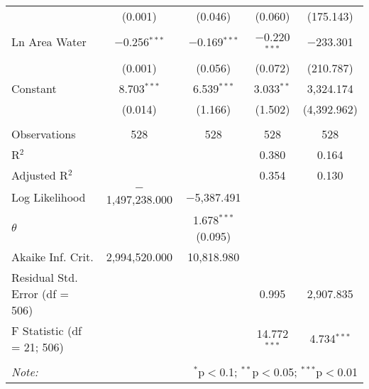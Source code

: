 \begin{table}[!htbp]
\begin{tabular}{@{\extracolsep{5pt}}lcccc}
  & (0.001) & (0.046) & (0.060) & (175.143) \\ 
  Ln Area Water & $-$0.256$^{***}$ & $-$0.169$^{***}$ & $-$0.220$^{***}$ & $-$233.301 \\ 
  & (0.001) & (0.056) & (0.072) & (210.787) \\ 
  Constant & 8.703$^{***}$ & 6.539$^{***}$ & 3.033$^{**}$ & 3,324.174 \\ 
  & (0.014) & (1.166) & (1.502) & (4,392.962) \\ 
 \hline \\[-1.8ex] 
Observations & 528 & 528 & 528 & 528 \\ 
R$^{2}$ &  &  & 0.380 & 0.164 \\ 
Adjusted R$^{2}$ &  &  & 0.354 & 0.130 \\ 
Log Likelihood & $-$1,497,238.000 & $-$5,387.491 &  &  \\ 
$\theta$ &  & 1.678$^{***}$  (0.095) &  &  \\ 
Akaike Inf. Crit. & 2,994,520.000 & 10,818.980 &  &  \\ 
Residual Std. Error (df = 506) &  &  & 0.995 & 2,907.835 \\ 
F Statistic (df = 21; 506) &  &  & 14.772$^{***}$ & 4.734$^{***}$ \\ 
\hline 
\hline \\[-1.8ex] 
\textit{Note:}  & \multicolumn{4}{r}{$^{*}$p$<$0.1; $^{**}$p$<$0.05; $^{***}$p$<$0.01} \\ 
\end{tabular} 
\end{table} 
